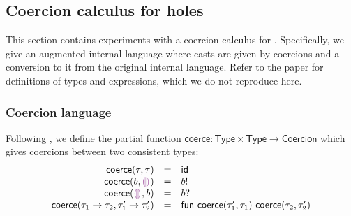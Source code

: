\documentclass[index.tex]{subfiles}
\begin{document}
\newcommand{\coerce}{\ensuremath{\textsf{coerce}}}
\newcommand{\coerces}[2]{#1 \rightsquigarrow #2}
\newcommand{\ctxCoercesType}[4]{\ensuremath{\ctxAssignType{#1}{#2}{\coerces{#3}{#4}}}}

\newcommand{\convertsInto}[2]{\ensuremath{#1 \hookrightarrow #2}}
\newcommand{\ctxConvertsInto}[3]{\ensuremath{\withCtx{#1}{\convertsInto{#2}{#3}}}}

\newcommand{\TMName}{\textsf{Type}}
\newcommand{\TMV}{\ensuremath{\tau}}
\newcommand{\TBase}{\ensuremath{b}}
\newcommand{\THole}{\ensuremath{\SyEHole{}{}}}
\newcommand{\TArrow}[2]{\ensuremath{#1 \to #2}}

\newcommand{\CMName}{\textsf{Coercion}}
\newcommand{\CMV}{\ensuremath{c}}

\newcommand{\CId}{\ensuremath{\textsf{id}}}
\newcommand{\CFail}{\ensuremath{\textsf{fail}}}
\newcommand{\CEmb}[1]{\ensuremath{#1!}}
\newcommand{\CProj}[1]{\ensuremath{#1?}}
\newcommand{\CFun}[2]{\ensuremath{\textsf{fun} ~#1 ~#2}}
\newcommand{\CCompose}[2]{\ensuremath{#1; #2}}

\newcommand{\DTMName}{\textsf{Dynamic Tag}}
\newcommand{\DTMV}{\ensuremath{g}}
\newcommand{\DTBase}{\ensuremath{\TBase}}
\newcommand{\DTFun}{\ensuremath{\textsf{fun}}}

\newcommand{\IEMName}{\textsf{Internal Expression}}
\newcommand{\IEMVO}{\ensuremath{d}}
\newcommand{\IEMV}{\ensuremath{\prescript{c}{}{d}}}
\newcommand{\IECast}[2]{\ensuremath{#1 \langle #2 \rangle}}
\newcommand{\IECastO}[3]{\ensuremath{\IECast{#1}{#2 \Rightarrow #3}}}

\subsection{Coercion calculus for holes}
\label{sec:coercion}
This section contains experiments with a coercion calculus \cite{herman2010} for \Hazelnut{}.
Specifically, we give an augmented internal language where casts are given by coercions and a
conversion to it from the original internal language. Refer to the \HazelnutLive{} paper
\cite{omar2019} for definitions of types and expressions, which we do not reproduce here.

\subsubsection{Coercion language}
Following \textcite{herman2010}, we define the partial function $\coerce : \TMName \times \TMName
\to \CMName$ which gives coercions between two consistent types:
%
\newcommand{\coerceRowIs}[3]{\ensuremath{\coerce(#1, #2) &=& #3}}
\[\begin{array}{rcl}
  \coerceRowIs{\TMV}{\TMV}{\CId} \\
  \coerceRowIs{\TBase}{\THole}{\CEmb{\DTBase}} \\
  \coerceRowIs{\THole}{\TBase}{\CProj{\DTBase}} \\
  \coerceRowIs{\TArrow{\TMV_1}{\TMV_2}}{\TArrow{\TMV_1'}{\TMV_2'}}{\CFun{\coerce(\TMV_1', \TMV_1)}{\coerce(\TMV_2, \TMV_2')}} \\
\end{array}\]
\end{document}
